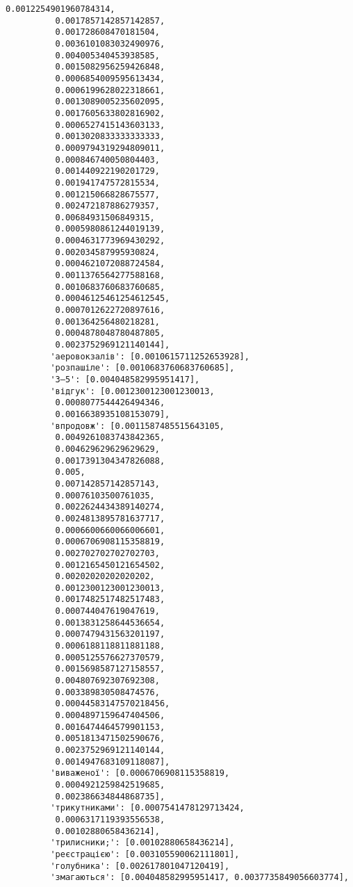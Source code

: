 \documentclass[11pt]{article}
\begin{document}
\begin{Verbatim}[commandchars=\\\{\}]
          0.0012254901960784314,
          0.0017857142857142857,
          0.001728608470181504,
          0.0036101083032490976,
          0.004005340453938585,
          0.0015082956259426848,
          0.0006854009595613434,
          0.0006199628022318661,
          0.0013089005235602095,
          0.0017605633802816902,
          0.0006527415143603133,
          0.0013020833333333333,
          0.0009794319294809011,
          0.000846740050804403,
          0.001440922190201729,
          0.001941747572815534,
          0.001215066828675577,
          0.002472187886279357,
          0.00684931506849315,
          0.0005980861244019139,
          0.0004631773969430292,
          0.002034587995930824,
          0.0004621072088724584,
          0.0011376564277588168,
          0.0010683760683760685,
          0.00046125461254612545,
          0.0007012622720897616,
          0.001364256480218281,
          0.0004878048780487805,
          0.0023752969121140144],
         'аеровокзалів': [0.0010615711252653928],
         'розпашіле': [0.0010683760683760685],
         '3–5': [0.004048582995951417],
         'відгук': [0.0012300123001230013,
          0.0008077544426494346,
          0.0016638935108153079],
         'впродовж': [0.0011587485515643105,
          0.0049261083743842365,
          0.004629629629629629,
          0.0017391304347826088,
          0.005,
          0.007142857142857143,
          0.00076103500761035,
          0.0022624434389140274,
          0.0024813895781637717,
          0.0006600660066006601,
          0.0006706908115358819,
          0.002702702702702703,
          0.0012165450121654502,
          0.00202020202020202,
          0.0012300123001230013,
          0.0017482517482517483,
          0.000744047619047619,
          0.0013831258644536654,
          0.0007479431563201197,
          0.0006188118811881188,
          0.0005125576627370579,
          0.0015698587127158557,
          0.004807692307692308,
          0.003389830508474576,
          0.00044583147570218456,
          0.0004897159647404506,
          0.0016474464579901153,
          0.0051813471502590676,
          0.0023752969121140144,
          0.0014947683109118087],
         'виваженої': [0.0006706908115358819,
          0.0004921259842519685,
          0.002386634844868735],
         'трикутниками': [0.0007541478129713424,
          0.0006317119393556538,
          0.00102880658436214],
         'трилисники;': [0.00102880658436214],
         'реєстрацією': [0.003105590062111801],
         'голубника': [0.002617801047120419],
         'змагаються': [0.004048582995951417, 0.0037735849056603774],

\end{Verbatim}
\end{document}
